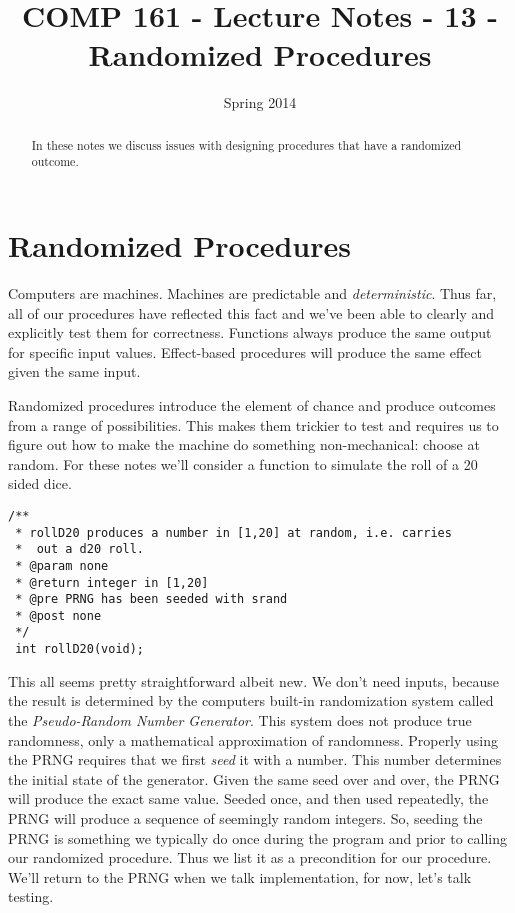 \documentclass[]{tufte-handout}
\title{COMP 161 - Lecture Notes - 13 - Randomized Procedures}
\date{Spring 2014}
\begin{document}
 
\maketitle

\begin{abstract}
In these notes we discuss issues with designing procedures that have a randomized outcome.
\end{abstract}


\section{Randomized Procedures}

Computers are machines. Machines are predictable and \textit{deterministic}. Thus far, all of our procedures have reflected this fact and we've been able to clearly and explicitly test them for correctness.  Functions always produce the same output for specific input values.  Effect-based procedures will produce the  same effect given the same input.  

Randomized procedures introduce the element of chance and produce outcomes from a range of possibilities. This makes them trickier to test and requires us to figure out how to make the machine do something non-mechanical: choose at random.  For these notes we'll consider a function to simulate the roll of a 20 sided dice.
\begin{verbatim}
/**
 * rollD20 produces a number in [1,20] at random, i.e. carries
 *  out a d20 roll.
 * @param none
 * @return integer in [1,20]
 * @pre PRNG has been seeded with srand
 * @post none
 */
 int rollD20(void);
\end{verbatim}

This all seems pretty straightforward albeit new.  We don't need inputs, because the result is determined by the computers built-in randomization system called the \textit{Pseudo-Random Number Generator}.  This system does not produce true randomness, only a mathematical approximation of randomness. Properly using the PRNG requires that we first \textit{seed} it with a number. This number determines the initial state of the generator. Given the same seed over and over, the PRNG will produce the exact same value. Seeded once, and then used repeatedly, the PRNG will produce a sequence of seemingly random integers. So, seeding the PRNG is something we typically do once during the program and prior to calling our randomized procedure. Thus we list it as a precondition for our procedure.  We'll return to the PRNG when we talk implementation, for now, let's talk testing.
\end{document}
